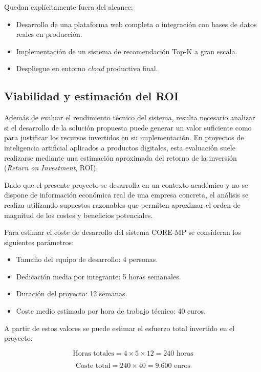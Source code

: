 Quedan explícitamente fuera del alcance:
\begin{itemize}
    \item Desarrollo de una plataforma web completa o integración con bases de datos reales en producción.
    \item Implementación de un sistema de recomendación Top-K a gran escala.
    \item Despliegue en entorno \textit{cloud} productivo final.
\end{itemize}

\subsection{Viabilidad y estimación del ROI}

Además de evaluar el rendimiento técnico del sistema, resulta necesario analizar 
si el desarrollo de la solución propuesta puede generar un valor suficiente como 
para justificar los recursos invertidos en su implementación. En proyectos de 
inteligencia artificial aplicados a productos digitales, esta evaluación suele 
realizarse mediante una estimación aproximada del retorno de la inversión 
(\textit{Return on Investment}, ROI).

Dado que el presente proyecto se desarrolla en un contexto académico y no se 
dispone de información económica real de una empresa concreta, el análisis se 
realiza utilizando supuestos razonables que permiten aproximar el orden de 
magnitud de los costes y beneficios potenciales.

Para estimar el coste de desarrollo del sistema CORE-MP se consideran los 
siguientes parámetros:

\begin{itemize}
    \item Tamaño del equipo de desarrollo: 4 personas.
    \item Dedicación media por integrante: 5 horas semanales.
    \item Duración del proyecto: 12 semanas.
    \item Coste medio estimado por hora de trabajo técnico: 40 euros.
\end{itemize}

A partir de estos valores se puede estimar el esfuerzo total invertido en el 
proyecto:

\[
\text{Horas totales} = 4 \times 5 \times 12 = 240 \text{ horas}
\]

\[
\text{Coste total} = 240 \times 40 = 9.600 \text{ euros}
\]

